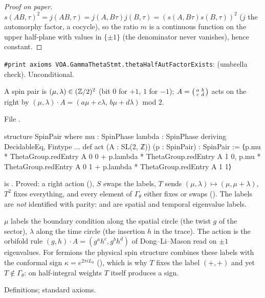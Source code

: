 \begin{proof}[Proof on paper]
$s(AB,\tau)^2=j(AB,\tau)=j(A,B\tau)j(B,\tau)=(s(A,B\tau)s(B,\tau))^2$ ($j$ the automorphy factor, a
cocycle), so the ratio $m$ is a continuous function on the upper half-plane with values in $\{\pm1\}$
(the denominator never vanishes), hence constant.
\end{proof}
\begin{status}
\texttt{\#print axioms VOA.GammaThetaStmt.thetaHalfAutFactorExists}:  (umbrella check). Unconditional.
\end{status}

\begin{definition}\label{l17:def:spinpair}
A spin pair is $(\mu,\lambda)\in({\mathbb{Z}}/2)^2$ (bit $0$ for $+1$, $1$ for $-1$); $A=\begin{psmallmatrix}a&b\\c&d\end{psmallmatrix}$
acts on the right by $(\mu,\lambda)\cdot A=(a\mu+c\lambda,\,b\mu+d\lambda)$ mod $2$.
\end{definition}
\noindent File .
\begin{leancode}
structure SpinPair where
  mu : SpinPhase
  lambda : SpinPhase
deriving DecidableEq, Fintype
...
def act (A : SL(2, ℤ)) (p : SpinPair) : SpinPair :=
  ⟨p.mu * ThetaGroup.redEntry A 0 0 + p.lambda * ThetaGroup.redEntry A 1 0,
   p.mu * ThetaGroup.redEntry A 0 1 + p.lambda * ThetaGroup.redEntry A 1 1⟩
\end{leancode}
\begin{dictionary}
 is . Proved: a right action (), $S$ swaps the labels,
$T$ sends $(\mu,\lambda)\mapsto(\mu,\mu+\lambda)$, $T^2$ fixes everything, and every element of
$\Gamma_\theta$ either fixes or swaps (). The labels are \emph{not}
identified with parity:  and  are spatial and temporal eigenvalue labels.
\end{dictionary}
\begin{physics}
$\mu$ labels the boundary condition along the spatial circle (the twist $g$ of the sector), $\lambda$
along the time circle (the insertion $h$ in the trace). The action is the orbifold rule
$(g,h)\cdot A=(g^ah^c,g^bh^d)$ of Dong--Li--Mason read on $\pm1$ eigenvalues. For fermions the physical
spin structure combines these labels with the conformal sign $\kappa=e^{2\pi iL_0}$ (),
which is why $T$ fixes the label $(+,+)$ and yet $T\notin\Gamma_\theta$: on half-integral weights $T$
itself produces a sign.
\end{physics}
\begin{status}
Definitions; standard axioms.
\end{status}

